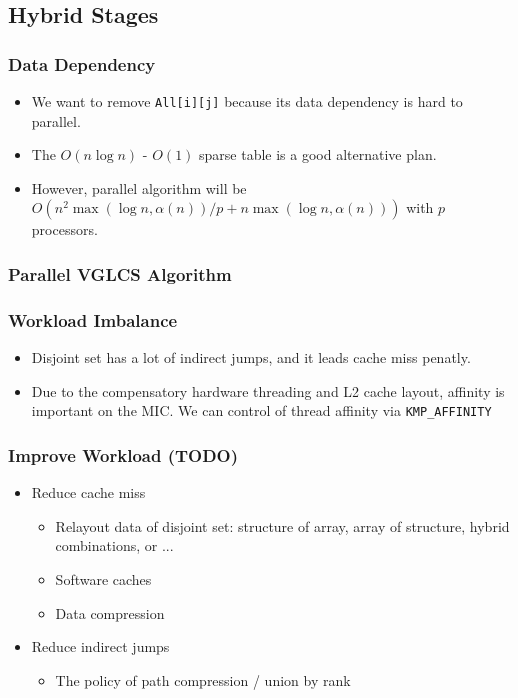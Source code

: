 \subsection{Hybrid Stages}
\begin{frame}
	\frametitle{Data Dependency}
	\begin{itemize}
		\setlength\itemsep{1em}
		\item We want to remove \texttt{All[i][j]} because its data dependency 
			is hard to parallel.
		\item The $O(n \log n)$ - $O(1)$ sparse table is a good alternative plan. 
		\item However, parallel algorithm will be $O(n^2 \max(\log n, \alpha(n)) / p + n \max(\log n, \alpha(n)))$ 
			with $p$ processors.
	\end{itemize}
\end{frame}

\begin{frame}
	\frametitle{Parallel VGLCS Algorithm}
\end{frame}

\begin{frame}
	\frametitle{Workload Imbalance}
	\begin{itemize}
		\setlength\itemsep{1em}
		\item Disjoint set has a lot of indirect jumps, and it leads cache miss penatly.
		\item Due to the compensatory hardware threading and L2 cache layout, affinity 
			is important on the MIC. We can control of thread affinity via \tt{KMP\_AFFINITY}
	\end{itemize}
\end{frame}

\begin{frame}
	\frametitle{Improve Workload (TODO)}
	\begin{itemize}
		\setlength\itemsep{1em}
		\item Reduce cache miss
			\begin{itemize}
				\setlength\itemsep{1em}
			 	\item Relayout data of disjoint set: structure of array, 
			 		array of structure, hybrid combinations, or ...
			 	\item Software caches
			 	\item Data compression
			\end{itemize}
		\item Reduce indirect jumps
			\begin{itemize}
				\setlength\itemsep{1em}
				\item The policy of path compression / union by rank
			\end{itemize}
	\end{itemize}
\end{frame}

